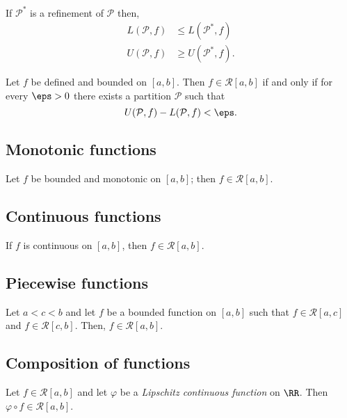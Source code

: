 \documentclass[12pt, a4paper]{article}
\begin{document}
\begin{lemma}
    If \(\mathcal{P}^*\) is a refinement of \(\mathcal{P}\) then,
    \[\begin{aligned}
        L(\mathcal{P},f) &\leq L(\mathcal{P}^*,f) \\
        U(\mathcal{P},f) &\geq U(\mathcal{P}^*,f).
    \end{aligned}\]
\end{lemma}

\begin{mdthm}
    Let \(f\) be defined and bounded on \([a,b]\). Then \(f \in \mathcal{R}[a,b]\) if and only if for every \(\eps>0\) there exists a partition \(\mathcal{P}\) such that
    \[U(\mathcal{P},f)-L(\mathcal{P},f) <\eps.\]
\end{mdthm}

\subsection{Monotonic functions}

\begin{mdthm}
    Let \(f\) be bounded and monotonic on \([a,b]\); then \(f \in \mathcal{R}[a,b]\).
\end{mdthm}

\subsection{Continuous functions}

\begin{mdthm}
    If \(f\) is continuous on \([a,b]\), then \(f \in \mathcal{R}[a,b]\).
\end{mdthm}

\subsection{Piecewise functions}

\begin{mdlemma}
    Let \(a<c<b\) and let \(f\) be a bounded function on \([a,b]\) such that \(f \in \mathcal{R}[a,c]\) and \(f\in \mathcal{R}[c,b]\). Then, \(f\in \mathcal{R}[a,b]\).
\end{mdlemma}

\subsection{Composition of functions}

\begin{mdthm}
    Let \(f\in \mathcal{R}[a,b]\) and let \(\varphi\) be a \textit{Lipschitz continuous function} on \(\RR\). Then \(\varphi \circ f \in \mathcal{R}[a,b]\).
\end{mdthm}
\end{document}
